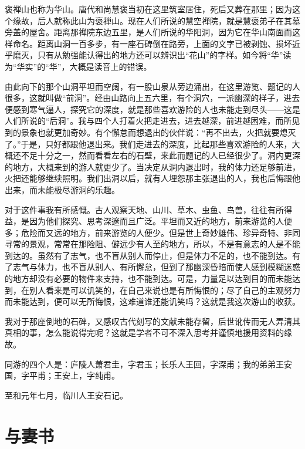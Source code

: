 \documentclass[12pt,UTF-8,openany,a4]{ctexbook}
\begin{document}
\begin{large}
    \yiwen 
    褒禅山也称为华山。唐代和尚慧褒当初在这里筑室居住，死后又葬在那里；因为这个缘故，后人就称此山为褒禅山。现在人们所说的慧空禅院，就是慧褒弟子在其墓旁盖的屋舍。距离那禅院东边五里，是人们所说的华阳洞，因为它在华山南面而这样命名。距离山洞一百多步，有一座石碑倒在路旁，上面的文字已被剥蚀、损坏近乎磨灭，只有从勉强能认得出的地方还可以辨识出“花山”的字样。如今将“华”读为“华实”的“华”，大概是读音上的错误。
    
    由此向下的那个山洞平坦而空阔，有一股山泉从旁边涌出，在这里游览、题记的人很多，这就叫做“前洞”。经由山路向上五六里，有个洞穴，一派幽深的样子，进去便感到寒气逼人，探究它的深度，就是那些喜欢游险的人也未能走到尽头——这是人们所说的“后洞”。我与四个人打着火把走进去，进去越深，前进越困难，而所见到的景象也就更加奇妙。有个懈怠而想退出的伙伴说：“再不出去，火把就要熄灭了。”于是，只好都跟他退出来。我们走进去的深度，比起那些喜欢游险的人来，大概还不足十分之一，然而看看左右的石壁，来此而题记的人已经很少了。洞内更深的地方，大概来到的游人就更少了。当决定从洞内退出时，我的体力还足够前进，火把还能够继续照明。我们出洞以后，就有人埋怨那主张退出的人，我也后悔跟他出来，而未能极尽游洞的乐趣。
    
    对于这件事我有所感慨。古人观察天地、山川、草木、虫鱼、鸟兽，往往有所得益，是因为他们探究、思考深邃而且广泛。平坦而又近的地方，前来游览的人便多；危险而又远的地方，前来游览的人便少。但是世上奇妙雄伟、珍异奇特、非同寻常的景观，常常在那险阻、僻远少有人至的地方，所以，不是有意志的人是不能到达的。虽然有了志气，也不盲从别人而停止，但是体力不足的，也不能到达。有了志气与体力，也不盲从别人、有所懈怠，但到了那幽深昏暗而使人感到模糊迷惑的地方却没有必要的物件来支持，也不能到达。可是，力量足以达到目的而未能达到，在别人看来是可以讥笑的，在自己来说也是有所悔恨的；尽了自己的主观努力而未能达到，便可以无所悔恨，这难道谁还能讥笑吗？这就是我这次游山的收获。
    
    我对于那座倒地的石碑，又感叹古代刻写的文献未能存留，后世讹传而无人弄清其真相的事，怎么能说得完呢？这就是学者不可不深入思考并谨慎地援用资料的缘故。
    
    同游的四个人是：庐陵人萧君圭，字君玉；长乐人王回，字深甫；我的弟弟王安国，字平甫；王安上，字纯甫。
    
    至和元年七月，临川人王安石记。
    
\end{large}



\chapter{与妻书}
\end{document}
